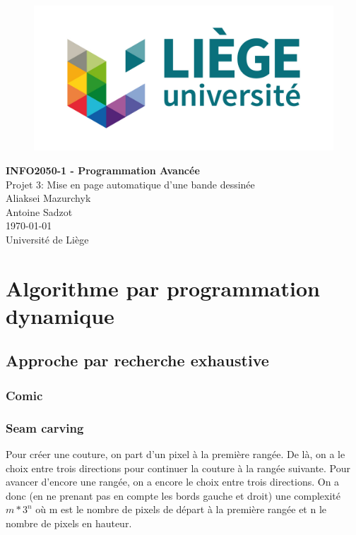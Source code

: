 \documentclass[10pt]{article}
\begin{document}
\begin{titlepage}

   \begin{figure}[htbp]
      \centering
      \includegraphics{uliege-logo-couleurs-300.jpg}
   \end{figure}
  	
  	\hfill

	\begin{center}
		\vfill
		\textbf{
		\Huge{INFO2050-1 - Programmation Avancée}}\\
		\bigskip
		\huge{Projet 3: Mise en page automatique d'une bande dessinée}\\
		\bigskip %
		\smallskip
		\Large{Aliaksei Mazurchyk\\Antoine Sadzot}\\
		\bigskip
		\smallskip
		\large{\today}\\%
		\vfill
		\large{Université de Liège}
	\end{center}
\end{titlepage}
\clearpage
\clearpage

\section{Algorithme par programmation dynamique}
\subsection{Approche par recherche exhaustive}
\subsubsection{Comic}
\subsubsection{Seam carving}
Pour créer une couture, on part d'un pixel à la première rangée. De là, on a le choix entre trois directions pour continuer la couture à la rangée suivante. Pour avancer d'encore une rangée, on a encore le choix entre trois directions. On a donc (en ne prenant pas en compte les bords gauche et droit) une complexité $m*3^n$ où m est le nombre de pixels de départ à la première rangée et n le nombre de pixels en hauteur.
\end{document}

